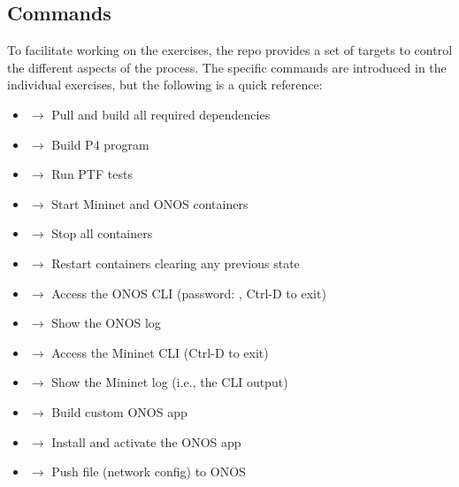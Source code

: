 \documentclass[letterpaper,11pt,english]{sphinxmanual}
\begin{document}
\subsection{Commands}
\label{\detokenize{exercises:commands}}
To facilitate working on the exercises, the repo provides a set of
 targets to control the different aspects of the process. The
specific commands are introduced in the individual exercises, but the
following is a quick reference:
\begin{itemize}
\item {} 
 \(\rightarrow\) Pull and build all required dependencies

\item {} 
 \(\rightarrow\) Build P4 program

\item {} 
 \(\rightarrow\) Run PTF tests

\item {} 
 \(\rightarrow\) Start Mininet and ONOS containers

\item {} 
 \(\rightarrow\) Stop all containers

\item {} 
 \(\rightarrow\) Restart containers clearing any previous state

\item {} 
 \(\rightarrow\) Access the ONOS CLI (password: , Ctrl-D to exit)

\item {} 
 \(\rightarrow\)  Show the ONOS log

\item {} 
 \(\rightarrow\)  Access the Mininet CLI (Ctrl-D to exit)

\item {} 
 \(\rightarrow\)  Show the Mininet log (i.e., the CLI output)

\item {} 
 \(\rightarrow\) Build custom ONOS app

\item {} 
 \(\rightarrow\)  Install and activate the ONOS app

\item {} 
 \(\rightarrow\)  Push  file (network config) to
ONOS

\end{itemize}
\end{document}
